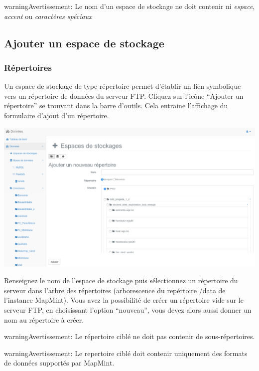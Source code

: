 \documentclass[letterpaper,10pt,french]{sphinxmanual}
\begin{document}
\begin{notice}{warning}{Avertissement:}
Le nom d'un espace de stockage ne doit contenir ni \emph{espace}, \emph{accent} ou \emph{caractères spéciaux}
\end{notice}


\subsection{Ajouter un espace de stockage}
\label{data/datastores:ajouter-un-espace-de-stockage}\label{data/datastores:datadatastores-add}

\subsubsection{Répertoires}
\label{data/datastores:repertoires}
Un espace de stockage de type répertoire permet d'établir un lien
symbolique vers un répertoire de données du serveur FTP. Cliquez sur
l'icône ``Ajouter un répertoire'' se trouvant dans la barre
d'outils. Cela entraine l'affichage du formulaire d'ajout d'un
répertoire.

\includegraphics[width=1.000\linewidth]{add-directory-window.png}

Renseignez le nom de l'espace de stockage puis sélectionnez un
répertoire du serveur dans l'arbre des répertoires (arborescence du
repértoire /data de l'instance MapMint). Vous avez la possibilité de
créer un répertoire vide sur le serveur FTP, en choisissant l'option
``nouveau'', vous devez alors aussi donner un nom au répertoire à
créer.

\begin{notice}{warning}{Avertissement:}
Le répertoire ciblé ne doit pas contenir de sous-répertoires.
\end{notice}

\begin{notice}{warning}{Avertissement:}
Le repertoire ciblé doit contenir uniquement des formats de données supportés par MapMint.
\end{notice}
\end{document}
